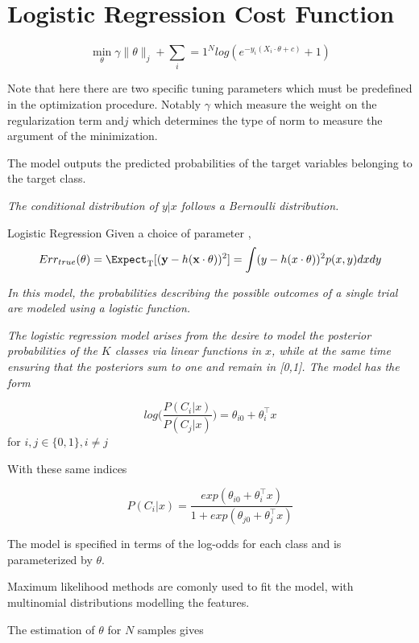 \section{Logistic Regression Cost Function}

\begin{equation} \label{logit}
 \min_{\theta} \gamma\| \theta\|_{j}  + \sum_i=1^N log(e^{-y_i (X_i \cdot \theta + c )} +1) 
\end{equation}

Note that here there are two specific tuning parameters which must be predefined in the optimization procedure. Notably $\gamma$ which measure the weight on the regularization term and$j$ which determines the type of norm to measure the argument of the minimization.

The model outputs the predicted probabilities of the target variables belonging to the target class.

\textit{The conditional distribution of $y|x$ follows a Bernoulli distribution.}


\begin{definition}{Logistic Regression}
Given a choice of parameter \theta,
\[
    Err_{true}(\theta)  = \Expect_{ \mathrm{T}}[(\textbf{y} - h(\textbf{x} \cdot \theta) )^2] \\
    = \int (y - h(x \cdot \theta) )^2 p(x,y)dxdy
\]
\end{definition}

\textit{In this model, the probabilities describing the possible outcomes of a single trial are modeled using a logistic function.}

\textit{The logistic regression model arises from the desire to model the posterior probabilities of the $K$ classes via linear functions in $x$, while at the same time ensuring that the posteriors sum to one and remain in [0,1]. The model has the form }


$$ log\big( \frac{P(C_i|x)}{P(C_j|x)}\big) = \theta_{i0}  + \theta_i^\intercal x  $$ for $i,j \in \{0,1\}, i\neq j$

With these same indices 

$$ P(C_i|x) = \frac{ exp(\theta_{i0}  + \theta_i^\intercal x)}{1 + exp(\theta_{j0}  + \theta_j^\intercal x)}   $$ 

The model is specified in terms of the log-odds for each class and is parameterized by $\theta$.

Maximum likelihood methods are comonly used to fit the model, with multinomial distributions modelling the features. 

The estimation of $\theta$ for $N$ samples gives




\textit{}
\textit{}
\textit{}